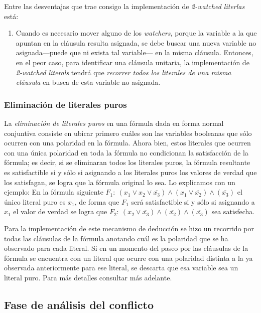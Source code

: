 \documentclass[12pt,lettersize,oneside]{article}
\begin{document}
Entre las desventajas que trae consigo la implementación de \emph{2-watched
  literlas} está:\vspace{-2.5mm}
\begin{enumerate}
\item Cuando es necesario mover alguno de los \emph{watchers}, porque la variable
  a la que apuntan en la cláusula resulta asignada, se debe buscar una nueva
  variable no asignada---puede que ni exista tal variable--- en la misma
  cláusula. Entonces, en el peor caso, para identificar una cláusula unitaria,
  la implementación de \emph{2-watched literals} tendrá que \emph{recorrer todos
    los literales de una misma cláusula} en busca de esta variable no asignada.
\end{enumerate}



\subsubsection{Eliminación de literales puros}

La \emph{eliminación de literales puros} en una fórmula dada en forma normal
conjuntiva consiste en ubicar primero cuáles son las variables booleanas que
sólo ocurren con una polaridad en la fórmula. Ahora bien, estos literales que
ocurren con una única polaridad en toda la fórmula no condicionan la
satisfacción de la fórmula; es decir, si se eliminaran todos los literales
puros, la fórmula resultante es satisfactible si y sólo si asignando a los
literales puros los valores de verdad que los satisfagan, se logra que la
fórmula original lo sea. Lo explicamos con un ejemplo: En la fórmula siguiente
$F_1:\ (x_1 \vee x_2 \vee \overline{x_3}) \wedge (x_1 \vee \overline{x_2})
\wedge (\overline{x_3})$ el único literal puro es $x_1$, de forma que $F_1$ será
satisfactible si y sólo si asignando a $x_1$ el valor de verdad se logra que
$F_2:\ (x_2 \vee \overline{x_3}) \wedge (\overline{x_2}) \wedge
(\overline{x_3})$ sea satisfecha.

Para la implementación de este mecanismo de deducción se hizo un recorrido por
todas las cláusulas de la fórmula anotando cuál es la polaridad que se ha
observado para cada literal. Si en un momento del paseo por las cláusulas de la
fórmula se encuentra con un literal que ocurre con una polaridad distinta a la
ya observada anteriormente para ese literal, se descarta que esa variable sea un
literal puro. Para más detalles consultar más adelante.

\subsection{Fase de análisis del conflicto}
\end{document}
